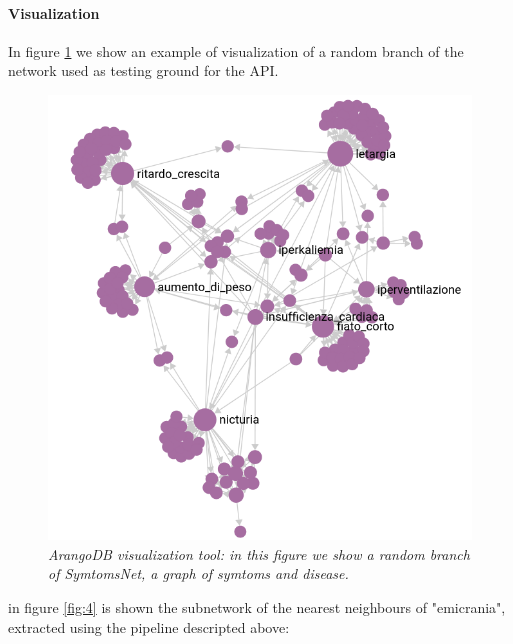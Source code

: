 \documentclass[11pt,twocolumn]{article}
\begin{document}
\paragraph{Visualization}
In figure \ref{fig:3} we show an example of visualization of a random branch of the network used as testing ground for the API.

\begin{figure}[ht!]
   \includegraphics[width=\linewidth]{images/Sym_Net_crop.png}
   \caption{\small{\textit{ArangoDB visualization tool: in this figure we show a random branch of SymtomsNet, a graph of symtoms and disease.}}}
   \label{fig:3}
\end{figure}

in figure \ref{fig:4} is shown the subnetwork of the nearest neighbours of "emicrania", extracted using the pipeline descripted above: 
\end{document}
